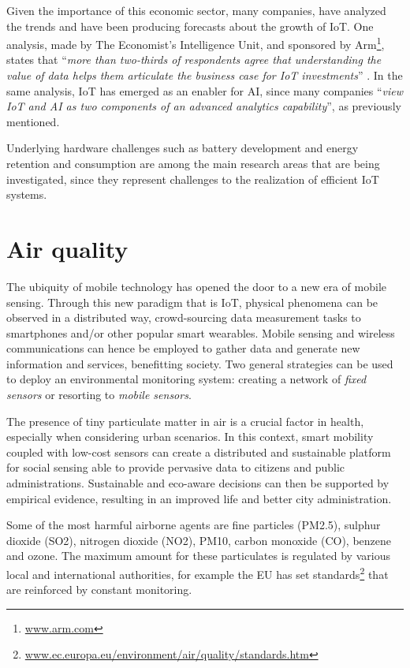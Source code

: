 			Given the importance of this economic sector, many companies, have analyzed the trends and have been producing forecasts about the growth of IoT.
			One analysis, made by The Economist's Intelligence Unit, and sponsored by Arm\footnote{ \url{www.arm.com}}, states that ``\textit{more than two-thirds of respondents agree that understanding the value of data helps them articulate the business case for IoT investments}'' \cite{economist-iot-business-index-2020-arm}.
			In the same analysis, IoT has emerged as an enabler for AI, since many companies ``\textit{view IoT and AI as two components of an advanced analytics capability}'', as previously mentioned.
	
			Underlying hardware challenges such as battery development and energy retention and consumption are among the main research areas that are being investigated, since they represent challenges to the realization of efficient IoT systems.
				
	\section{Air quality}
	
		The ubiquity of mobile technology has opened the door to a new era of mobile sensing. 
		Through this new paradigm that is IoT, physical phenomena can be observed in a distributed way, crowd-sourcing data measurement tasks to smartphones and/or other popular smart wearables.
		Mobile sensing and wireless communications can hence be employed to gather data and generate new information and services, benefitting society.
		Two general strategies can be used to deploy an environmental monitoring system: creating a network of \textit{fixed sensors}	or resorting to \textit{mobile sensors}.
			
		The presence of tiny particulate matter in air is a crucial factor in health, especially when considering urban scenarios.
		In this context, smart mobility coupled with low-cost sensors can create a distributed and sustainable platform for social sensing able to provide pervasive data to citizens and public administrations. 
		Sustainable and eco-aware decisions can then be supported by empirical evidence, resulting in an improved life and better city administration.
		
		Some of the most harmful airborne agents are fine particles (PM2.5), sulphur dioxide (SO2), nitrogen dioxide (NO2), PM10, carbon monoxide (CO), benzene and ozone.
		The maximum amount for these particulates is regulated by various local and international authorities, for example the EU has set standards\footnote{ \url{www.ec.europa.eu/environment/air/quality/standards.htm}} that are reinforced by constant monitoring.
				
